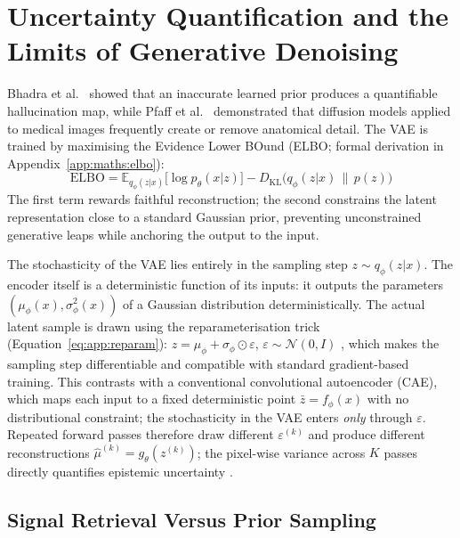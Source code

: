 \documentclass[12pt, a4paper, twoside, openright]{book}
\begin{document}
\section{Uncertainty Quantification and the Limits of Generative Denoising}
\label{sec:lit:uncertainty}

Bhadra et al.\ \cite{bhadra_hallucinations_2021} showed that an inaccurate learned prior produces a quantifiable hallucination map, while Pfaff et al.\ \cite{pfaff_no-new-denoiser_2024} demonstrated that diffusion models applied to medical images frequently create or remove anatomical detail. The VAE \cite{kingma_auto-encoding_2014} is trained by maximising the Evidence Lower BOund (ELBO; formal derivation in Appendix~\ref{app:maths:elbo}):
\begin{equation*}
\mathrm{ELBO} = \mathbb{E}_{q_\phi(z|x)}\bigl[\log p_\theta(x|z)\bigr] - D_{\mathrm{KL}}\bigl(q_\phi(z|x)\,\|\,p(z)\bigr)
\end{equation*}
The first term rewards faithful reconstruction; the second constrains the latent representation close to a standard Gaussian prior, preventing unconstrained generative leaps while anchoring the output to the input.

The stochasticity of the VAE lies entirely in the sampling step $z \sim q_\phi(z|x)$. The encoder itself is a deterministic function of its inputs: it outputs the parameters $(\mu_\phi(x), \sigma^2_\phi(x))$ of a Gaussian distribution deterministically. The actual latent sample is drawn using the reparameterisation trick (Equation~\ref{eq:app:reparam}): $z = \mu_\phi + \sigma_\phi \odot \varepsilon$, $\varepsilon \sim \mathcal{N}(0,I)$ \cite{kingma_auto-encoding_2014}, which makes the sampling step differentiable and compatible with standard gradient-based training. This contrasts with a conventional convolutional autoencoder (CAE), which maps each input to a fixed deterministic point $\bar{z} = f_\phi(x)$ with no distributional constraint; the stochasticity in the VAE enters \emph{only} through $\varepsilon$. Repeated forward passes therefore draw different $\varepsilon^{(k)}$ and produce different reconstructions $\hat{\mu}^{(k)} = g_\theta(z^{(k)})$; the pixel-wise variance across $K$ passes directly quantifies epistemic uncertainty \cite{kendall_what_2017}.

\subsection{Signal Retrieval Versus Prior Sampling}
\label{sec:lit:uncertainty:retrieval}
\end{document}
